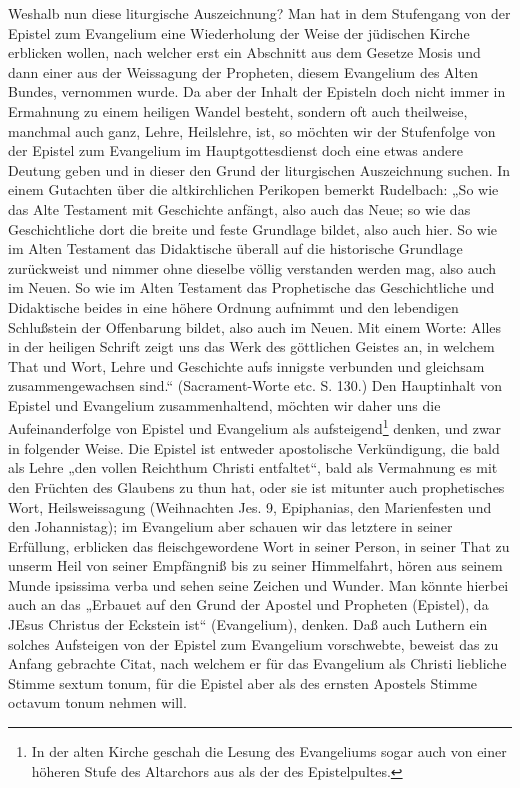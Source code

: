 Weshalb nun diese liturgische Auszeichnung? Man hat in dem Stufengang von der Epistel zum Evangelium eine Wiederholung der Weise der jüdischen Kirche erblicken wollen, nach welcher erst ein Abschnitt aus dem Gesetze Mosis und dann einer aus der Weissagung der Propheten, diesem Evangelium des Alten Bundes, vernommen wurde. Da aber der Inhalt der Episteln doch nicht immer in Ermahnung zu einem heiligen Wandel besteht, sondern oft auch theilweise, manchmal auch ganz, Lehre, Heilslehre, ist, so möchten wir der Stufenfolge von der Epistel zum Evangelium im Hauptgottesdienst doch eine etwas andere Deutung geben und in dieser den Grund der liturgischen Auszeichnung suchen. In einem Gutachten über die altkirchlichen Perikopen bemerkt Rudelbach: „So wie das Alte Testament mit Geschichte anfängt, also auch das Neue; so wie das Geschichtliche dort die breite und feste Grundlage bildet, also auch hier. So wie im Alten Testament das Didaktische überall auf die historische Grundlage zurückweist und nimmer ohne dieselbe völlig verstanden werden mag, also auch im Neuen. So wie im Alten Testament das Prophetische das Geschichtliche und Didaktische beides in eine höhere Ordnung aufnimmt und den lebendigen Schlußstein der Offenbarung bildet, also auch im Neuen. Mit einem Worte: Alles in der heiligen Schrift zeigt uns das Werk des göttlichen Geistes an, in welchem That und Wort, Lehre und Geschichte aufs innigste verbunden und gleichsam zusammengewachsen sind.“ (Sacrament-Worte etc. S. 130.) Den Hauptinhalt von Epistel und Evangelium zusammenhaltend, möchten wir daher uns die Aufeinanderfolge von Epistel und Evangelium als aufsteigend\footnote{In der alten Kirche geschah die Lesung des Evangeliums sogar auch von einer höheren Stufe des Altarchors aus als der des Epistelpultes.} denken, und zwar in folgender Weise. Die Epistel ist entweder apostolische Verkündigung, die bald als Lehre „den vollen Reichthum Christi entfaltet“, bald als Vermahnung es mit den Früchten des Glaubens zu thun hat, oder sie ist mitunter auch prophetisches Wort, Heilsweissagung (Weihnachten Jes. 9, Epiphanias, den Marienfesten und den Johannistag); im
Evangelium aber schauen wir das letztere in seiner Erfüllung, erblicken das fleischgewordene Wort in seiner Person, in seiner That zu unserm Heil von seiner Empfängniß bis zu seiner Himmelfahrt, hören aus seinem Munde ipsissima verba und sehen seine Zeichen und Wunder. Man könnte hierbei auch an das „Erbauet auf den Grund der Apostel und Propheten (Epistel), da JEsus Christus der Eckstein ist“ (Evangelium), denken. Daß auch Luthern ein solches Aufsteigen von der Epistel zum Evangelium vorschwebte, beweist das zu Anfang gebrachte Citat, nach welchem er für das Evangelium als Christi liebliche Stimme sextum tonum, für die Epistel aber als des ernsten Apostels Stimme octavum tonum nehmen will.

